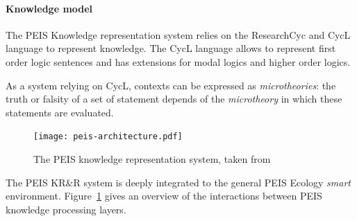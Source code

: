 \documentclass[a4paper, twocolumn]{article}
\begin{document}


\paragraph{Knowledge model} The PEIS Knowledge representation system relies on
the {\sc ResearchCyc} and {\sc CycL} language to represent knowledge. The {\sc CycL} language
allows to represent first order logic sentences and has extensions for modal logics and higher order logics.


As a system relying on {\sc CycL}, contexts can be expressed as
\emph{microtheories}: the truth or falsity of a set of statement depends of the
\emph{microtheory} in which these statements are evaluated.


\begin{figure}
	\centering
	\texttt{[image: peis-architecture.pdf]}
	\caption{The PEIS knowledge representation system, taken from~\cite{Daoutis2009}}
	\label{fig|peis-archi}
\end{figure}

The PEIS KR\&R system is deeply integrated to the general PEIS Ecology
\emph{smart} environment. Figure~\ref{fig|peis-archi} gives an overview of the
interactions between PEIS knowledge processing layers.
\end{document}
